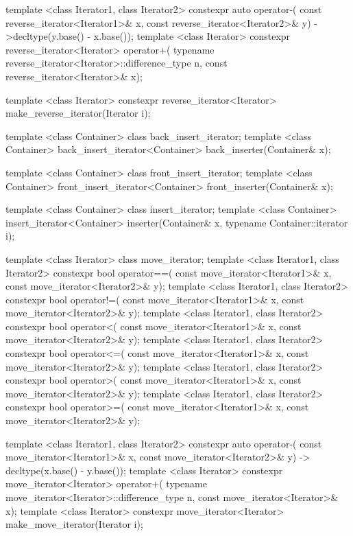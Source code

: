 \begin{codeblock}
{  template <class Iterator1, class Iterator2>
    constexpr auto operator-(
      const reverse_iterator<Iterator1>& x,
      const reverse_iterator<Iterator2>& y) ->decltype(y.base() - x.base());
  template <class Iterator>
    constexpr reverse_iterator<Iterator>
      operator+(
    typename reverse_iterator<Iterator>::difference_type n,
    const reverse_iterator<Iterator>& x);

  template <class Iterator>
    constexpr reverse_iterator<Iterator> make_reverse_iterator(Iterator i);    

  template <class Container> class back_insert_iterator;
  template <class Container>
    back_insert_iterator<Container> back_inserter(Container& x);

  template <class Container> class front_insert_iterator;
  template <class Container>
    front_insert_iterator<Container> front_inserter(Container& x);

  template <class Container> class insert_iterator;
  template <class Container>
    insert_iterator<Container> inserter(Container& x, typename Container::iterator i);

  template <class Iterator> class move_iterator;
  template <class Iterator1, class Iterator2>
    constexpr bool operator==(
      const move_iterator<Iterator1>& x, const move_iterator<Iterator2>& y);
  template <class Iterator1, class Iterator2>
    constexpr bool operator!=(
      const move_iterator<Iterator1>& x, const move_iterator<Iterator2>& y);
  template <class Iterator1, class Iterator2>
    constexpr bool operator<(
      const move_iterator<Iterator1>& x, const move_iterator<Iterator2>& y);
  template <class Iterator1, class Iterator2>
    constexpr bool operator<=(
      const move_iterator<Iterator1>& x, const move_iterator<Iterator2>& y);
  template <class Iterator1, class Iterator2>
    constexpr bool operator>(
      const move_iterator<Iterator1>& x, const move_iterator<Iterator2>& y);
  template <class Iterator1, class Iterator2>
    constexpr bool operator>=(
      const move_iterator<Iterator1>& x, const move_iterator<Iterator2>& y);

  template <class Iterator1, class Iterator2>
    constexpr auto operator-(
    const move_iterator<Iterator1>& x,
    const move_iterator<Iterator2>& y) -> decltype(x.base() - y.base());
  template <class Iterator>
    constexpr move_iterator<Iterator> operator+(
      typename move_iterator<Iterator>::difference_type n, const move_iterator<Iterator>& x);
  template <class Iterator>
    constexpr move_iterator<Iterator> make_move_iterator(Iterator i);

}
\end{codeblock}
